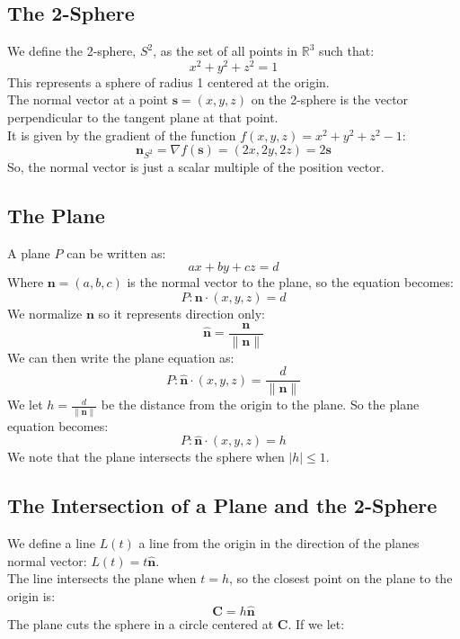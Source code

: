 \documentclass[11pt]{article}
\begin{document}
\newpage

\subsection*{The 2-Sphere}
We define the 2-sphere, $S^2$, as the set of all points in $\mathbb{R}^3$ such that:
$$x^2 + y^2 + z^2 = 1$$
This represents a sphere of radius 1 centered at the origin. \\
The normal vector at a point $\mathbf{s} = (x, y, z)$ on the 2-sphere is the vector perpendicular to the tangent plane at that point. \\
It is given by the gradient of the function $f(x,y,z) = x^2 + y^2 + z^2 - 1$:
$$\mathbf{n}_{S^2} = \nabla f(\mathbf{s}) = (2x, 2y, 2z) = 2\textbf{s}$$
So, the normal vector is just a scalar multiple of the position vector.
\subsection*{The Plane}
A plane $P$ can be written as:
$$ax + by + cz = d$$
Where $\textbf{n} = (a,b,c)$ is the normal vector to the plane, so the equation becomes:
$$P : \textbf{n} \cdot (x,y,z) = d$$
We normalize $\textbf{n}$ so it represents direction only:
$$\hat{\textbf{n}} = \frac{\textbf{n}}{\|\textbf{n}\|}$$
We can then write the plane equation as:
$$P : \hat{\textbf{n}} \cdot (x,y,z) = \frac{d}{\|\textbf{n}\|}$$
We let $h = \frac{d}{\|\textbf{n}\|}$ be the distance from the origin to the plane.
So the plane equation becomes:
$$P : \hat{\textbf{n}} \cdot (x,y,z) = h$$
We note that the plane intersects the sphere when $|h| \leq 1$.
\newpage
\subsection*{The Intersection of a Plane and the 2-Sphere}
We define a line $L(t)$ a line from the origin in the direction of the planes normal vector: $L(t) = t \hat{\textbf{n}}$. \\
The line intersects the plane when $t= h$, so the closest point on the plane to the origin is:
$$\mathbf{C} = h \hat{\mathbf{n}}
$$
The plane cuts the sphere in a circle centered at $\mathbf{C}$.
If we let:
\noindent
\end{document}
